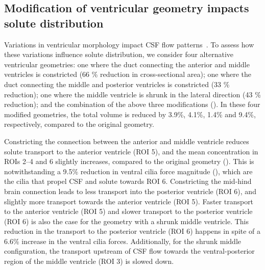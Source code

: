 \documentclass{WileyMSP-template}
\begin{document}
\subsection{Modification of ventricular geometry impacts solute distribution}
Variations in ventricular morphology impact CSF flow patterns~\cite{Olstad2019CiliaryDevelopment}.
To assess how these variations influence solute distribution,
we consider four alternative ventricular geometries:
one where the duct connecting the anterior and middle ventricles is constricted
(66 \% reduction in cross-sectional area);
one where the duct connecting the middle and posterior ventricles is constricted
(33 \% reduction);
one where the middle ventricle is shrunk in the lateral direction (43 \% reduction);
and the combination of the above three modifications ().
In these four modified geometries, the total volume is reduced by
3.9\%, 4.1\%, 1.4\% and 9.4\%, respectively,
compared to the original geometry.

Constricting the connection between the anterior and middle ventricle reduces
solute transport to the anterior ventricle (ROI 5),
and the mean concentration in ROIs 2--4 and 6 slightly increases, compared to the original geometry
(). This is notwithstanding a
9.5\% reduction in ventral cilia force magnitude
(), which are the cilia that propel CSF and solute towards ROI 6.
Constricting the mid-hind brain connection
leads to less transport into the posterior ventricle (ROI 6),
and slightly more transport towards the anterior ventricle (ROI 5).
Faster transport to the anterior ventricle (ROI 5) and slower transport to the
posterior ventricle (ROI 6) is also the case for the geometry with a
shrunk middle ventricle.
This reduction in the transport to the posterior ventricle (ROI 6)
happens in spite of a 6.6\% increase in the ventral cilia forces.
Additionally, for the shrunk middle configuration, the transport upstream of CSF flow towards the
ventral-posterior region of the middle ventricle (ROI 3) is slowed down.
\end{document}
